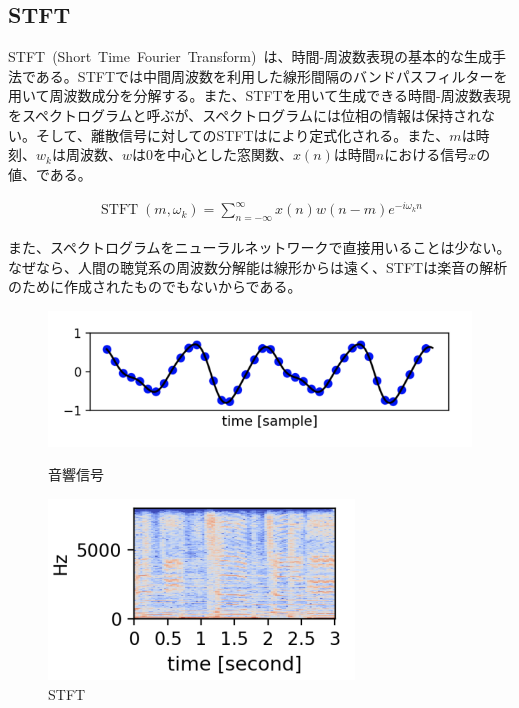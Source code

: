 \subsection{STFT}

STFT~(Short~Time~Fourier~Transform)~は、時間-周波数表現の基本的な生成手法である。STFTでは中間周波数を利用した線形間隔のバンドパスフィルターを用いて周波数成分を分解する。また、STFTを用いて生成できる時間-周波数表現をスペクトログラムと呼ぶが、スペクトログラムには位相の情報は保持されない。そして、離散信号に対してのSTFTはにより定式化される。また、$m$は時刻、$w_k$は周波数、$w$は0を中心とした窓関数、$x(n)$は時間$n$における信号$x$の値、である。

\begin{align}
    \label{eq:STFT}
    \operatorname{STFT}\left(m, \omega_k\right)=\sum_{n=-\infty}^{\infty} x(n) w(n-m) e^{-i \omega_k n}
\end{align}

また、スペクトログラムをニューラルネットワークで直接用いることは少ない。なぜなら、人間の聴覚系の周波数分解能は線形からは遠く、STFTは楽音の解析のために作成されたものでもないからである。

\begin{figure}[b]
\centering
\begin{minipage}[b]{0.48\columnwidth}
\centering
\includegraphics[width=\columnwidth]{figure/audio_signal.png}
\caption{音響信号}
\label{fig:audio_signal}
\end{minipage}
\begin{minipage}[b]{0.48\columnwidth}
\centering
\includegraphics[width=\columnwidth]{figure/stft.png}
\caption{STFT}
\label{fig:STFT}
\end{minipage}
\end{figure}

